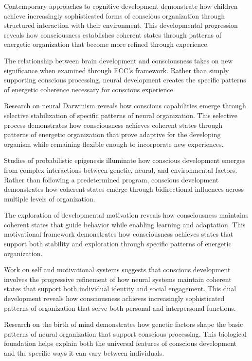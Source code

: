 Contemporary approaches to cognitive development \cite{Carey2009} demonstrate how children achieve increasingly sophisticated forms of conscious organization through structured interaction with their environment. This developmental progression reveals how consciousness establishes coherent states through patterns of energetic organization that become more refined through experience.

The relationship between brain development and consciousness \cite{Johnson2011} takes on new significance when examined through ECC's framework. Rather than simply supporting conscious processing, neural development creates the specific patterns of energetic coherence necessary for conscious experience.

Research on neural Darwinism \cite{Edelman1987} reveals how conscious capabilities emerge through selective stabilization of specific patterns of neural organization. This selective process demonstrates how consciousness achieves coherent states through patterns of energetic organization that prove adaptive for the developing organism while remaining flexible enough to incorporate new experiences.

Studies of probabilistic epigenesis \cite{Gottlieb2007} illuminate how conscious development emerges from complex interactions between genetic, neural, and environmental factors. Rather than following a predetermined program, conscious development demonstrates how coherent states emerge through bidirectional influences across multiple levels of organization.

The exploration of developmental motivation \cite{Kagan2013} reveals how consciousness maintains coherent states that guide behavior while enabling learning and adaptation. This motivational framework demonstrates how consciousness achieves states that support both stability and exploration through specific patterns of energetic organization.

Work on self and motivational systems \cite{Lichtenberg2016} suggests that conscious development involves the progressive refinement of how neural systems maintain coherent states that support both individual identity and social engagement. This dual development reveals how consciousness achieves increasingly sophisticated patterns of organization that serve both personal and interpersonal functions.

Research on the birth of mind \cite{Marcus2004} demonstrates how genetic factors shape the basic patterns of neural organization that support conscious processing. This biological foundation helps explain both the universal features of conscious development and the specific ways it can vary between individuals.

